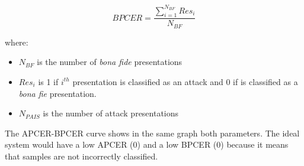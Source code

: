 \begin{equation}
  BPCER = \frac{\sum_{i=1}^{N_{BF}}Res_{i}}{N_{BF}}
\end{equation}

where: \begin{itemize}
\item $N_{BF}$ is the number of \textit{bona fide} presentations
\item $Res_{i}$ is 1 if $i^{th}$ presentation is classified as an attack and 0 if is classified as a \textit{bona fie} presentation.
\item $N_{PAIS}$ is the number of attack presentations
\end{itemize}

The APCER-BPCER curve shows in the same graph both parameters. The ideal system would have a low APCER (0) and a low BPCER (0) because it means that samples are not incorrectly classified.\\
